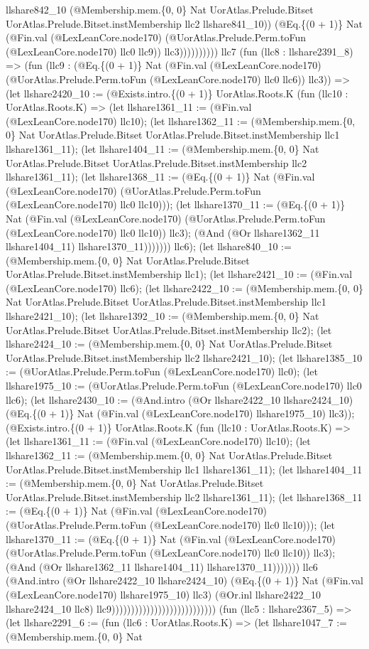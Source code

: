 \documentclass[11pt]{article}
\begin{document}
llshare842\_10 (@Membership.mem.\{0, 0\} Nat UorAtlas.Prelude.Bitset UorAtlas.Prelude.Bitset.instMembership llc2 llshare841\_10)) (@Eq.\{(0 + 1)\} Nat (@Fin.val (@LexLeanCore.node170) (@UorAtlas.Prelude.Perm.toFun (@LexLeanCore.node170) llc0 llc9)) llc3)))))))))) llc7 (fun (llc8 : llshare2391\_8) => (fun (llc9 : (@Eq.\{(0 + 1)\} Nat (@Fin.val (@LexLeanCore.node170) (@UorAtlas.Prelude.Perm.toFun (@LexLeanCore.node170) llc0 llc6)) llc3)) => (let llshare2420\_10 := (@Exists.intro.\{(0 + 1)\} UorAtlas.Roots.K (fun (llc10 : UorAtlas.Roots.K) => (let llshare1361\_11 := (@Fin.val (@LexLeanCore.node170) llc10); (let llshare1362\_11 := (@Membership.mem.\{0, 0\} Nat UorAtlas.Prelude.Bitset UorAtlas.Prelude.Bitset.instMembership llc1 llshare1361\_11); (let llshare1404\_11 := (@Membership.mem.\{0, 0\} Nat UorAtlas.Prelude.Bitset UorAtlas.Prelude.Bitset.instMembership llc2 llshare1361\_11); (let llshare1368\_11 := (@Eq.\{(0 + 1)\} Nat (@Fin.val (@LexLeanCore.node170) (@UorAtlas.Prelude.Perm.toFun (@LexLeanCore.node170) llc0 llc10))); (let llshare1370\_11 := (@Eq.\{(0 + 1)\} Nat (@Fin.val (@LexLeanCore.node170) (@UorAtlas.Prelude.Perm.toFun (@LexLeanCore.node170) llc0 llc10)) llc3); (@And (@Or llshare1362\_11 llshare1404\_11) llshare1370\_11))))))) llc6); (let llshare840\_10 := (@Membership.mem.\{0, 0\} Nat UorAtlas.Prelude.Bitset UorAtlas.Prelude.Bitset.instMembership llc1); (let llshare2421\_10 := (@Fin.val (@LexLeanCore.node170) llc6); (let llshare2422\_10 := (@Membership.mem.\{0, 0\} Nat UorAtlas.Prelude.Bitset UorAtlas.Prelude.Bitset.instMembership llc1 llshare2421\_10); (let llshare1392\_10 := (@Membership.mem.\{0, 0\} Nat UorAtlas.Prelude.Bitset UorAtlas.Prelude.Bitset.instMembership llc2); (let llshare2424\_10 := (@Membership.mem.\{0, 0\} Nat UorAtlas.Prelude.Bitset UorAtlas.Prelude.Bitset.instMembership llc2 llshare2421\_10); (let llshare1385\_10 := (@UorAtlas.Prelude.Perm.toFun (@LexLeanCore.node170) llc0); (let llshare1975\_10 := (@UorAtlas.Prelude.Perm.toFun (@LexLeanCore.node170) llc0 llc6); (let llshare2430\_10 := (@And.intro (@Or llshare2422\_10 llshare2424\_10) (@Eq.\{(0 + 1)\} Nat (@Fin.val (@LexLeanCore.node170) llshare1975\_10) llc3)); (@Exists.intro.\{(0 + 1)\} UorAtlas.Roots.K (fun (llc10 : UorAtlas.Roots.K) => (let llshare1361\_11 := (@Fin.val (@LexLeanCore.node170) llc10); (let llshare1362\_11 := (@Membership.mem.\{0, 0\} Nat UorAtlas.Prelude.Bitset UorAtlas.Prelude.Bitset.instMembership llc1 llshare1361\_11); (let llshare1404\_11 := (@Membership.mem.\{0, 0\} Nat UorAtlas.Prelude.Bitset UorAtlas.Prelude.Bitset.instMembership llc2 llshare1361\_11); (let llshare1368\_11 := (@Eq.\{(0 + 1)\} Nat (@Fin.val (@LexLeanCore.node170) (@UorAtlas.Prelude.Perm.toFun (@LexLeanCore.node170) llc0 llc10))); (let llshare1370\_11 := (@Eq.\{(0 + 1)\} Nat (@Fin.val (@LexLeanCore.node170) (@UorAtlas.Prelude.Perm.toFun (@LexLeanCore.node170) llc0 llc10)) llc3); (@And (@Or llshare1362\_11 llshare1404\_11) llshare1370\_11))))))) llc6 (@And.intro (@Or llshare2422\_10 llshare2424\_10) (@Eq.\{(0 + 1)\} Nat (@Fin.val (@LexLeanCore.node170) llshare1975\_10) llc3) (@Or.inl llshare2422\_10 llshare2424\_10 llc8) llc9))))))))))))))))))))))))))) (fun (llc5 : llshare2367\_5) => (let llshare2291\_6 := (fun (llc6 : UorAtlas.Roots.K) => (let llshare1047\_7 := (@Membership.mem.\{0, 0\} Nat 
\end{document}

